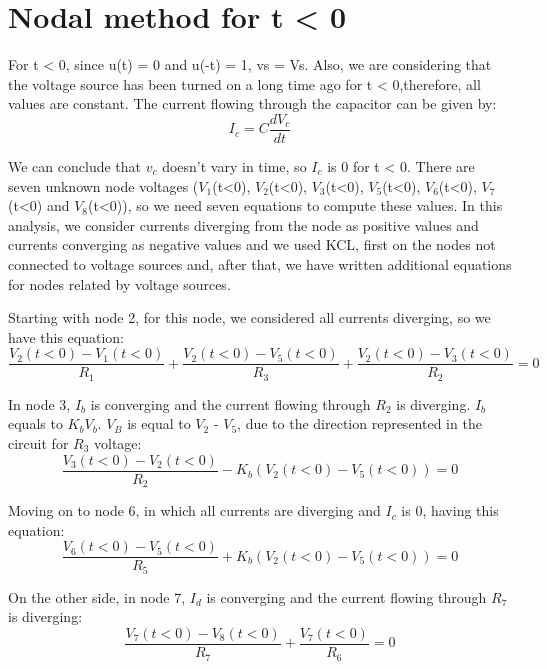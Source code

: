 \newpage

\section{Nodal method for t < 0}
\label{t<0}

\noindent For t < 0, since u(t) = 0 and u(-t) = 1, vs = Vs. 
Also, we are considering that the voltage source has been turned on a long time ago for t < 0,therefore, all values are constant. 
The current flowing through the capacitor can be given by:
\begin{equation}
I_c = C\frac{dV_c}{dt}
  \label{eq:Ic}
\end{equation}

\noindent We can conclude that $v_c$ doesn't vary in time, so $I_c$ is 0 for t < 0.
There are seven unknown node voltages ($V_1$(t<0), $V_2$(t<0), $V_3$(t<0), $V_5$(t<0), $V_6$(t<0), $V_7$(t<0) and $V_8$(t<0)), 
so we need seven equations to compute these values.
\noindent In this analysis, we consider currents diverging from the node as positive values and currents converging as negative values and we used KCL, 
first on the nodes not connected to voltage sources and, after that, we have written additional equations for nodes related by voltage sources.

\noindent Starting with node 2, for this node, we considered all currents diverging, so we have this equation:
\begin{equation}
\frac{V_2(t<0) - V_1(t<0)}{R_1} + \frac{V_2(t<0) - V_5(t<0)}{R_3} + \frac{V_2(t<0) - V_3(t<0)}{R_2} = 0
  \label{eq:kvl_node2}
\end{equation}

\noindent In node 3, $I_b$ is converging and the current flowing through $R_2$ is diverging. $I_b$ equals to $K_b$$V_b$.
$V_B$ is equal to $V_2$ - $V_5$, due to the direction represented in the circuit for $R_3$ voltage:
\begin{equation}
\frac{V_3(t<0) - V_2(t<0)}{R_2} - K_b(V_2(t<0) - V_5(t<0)) = 0
  \label{eq:kvl_node3}
\end{equation}

\noindent Moving on to node 6, in which all currents are diverging and $I_c$ is 0, having this equation:
\begin{equation}
\frac{V_6(t<0) - V_5(t<0)}{R_5} + K_b(V_2(t<0) - V_5(t<0)) = 0
  \label{eq:kvl_node6}
\end{equation}

\noindent On the other side, in node 7, $I_d$ is converging and the current flowing through $R_7$ is diverging:
\begin{equation}
\frac{V_7(t<0) - V_8(t<0)}{R_7} + \frac{V_7(t<0)}{R_6} = 0
  \label{eq:kvl_node7}
\end{equation}

